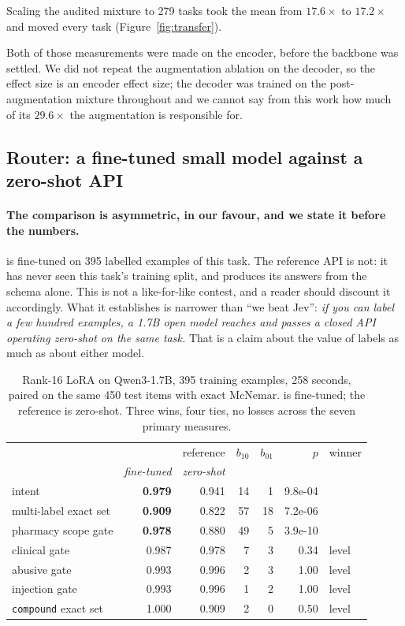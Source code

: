 Scaling the audited mixture to 279 tasks took the mean from $17.6\times$
to $17.2\times$ and moved every task (Figure~\ref{fig:transfer}).

Both of those measurements were made on the encoder, before the backbone
was settled. We did not repeat the augmentation ablation on the decoder,
so the effect size is an encoder effect size; the decoder was trained on
the post-augmentation mixture throughout and we cannot say from this work
how much of its $29.6\times$ the augmentation is responsible for.

\subsection{Router: a fine-tuned small model against a zero-shot API}
\label{sec:res-router}

\paragraph{The comparison is asymmetric, in our favour, and we state it
before the numbers.} \openjev{} is fine-tuned on 395 labelled examples of
this task. The reference API is not: it has never seen this task's
training split, and produces its answers from the schema alone. This is
not a like-for-like contest, and a reader should discount it accordingly.
What it establishes is narrower than ``we beat Jev'': \emph{if you can
label a few hundred examples, a 1.7B open model reaches and passes a
closed API operating zero-shot on the same task.} That is a claim about
the value of labels as much as about either model.

\begin{table}[t]
\centering
\begin{tabular}{lrrrrrl}
\toprule
 & \openjev{} & reference & $b_{10}$ & $b_{01}$ & $p$ & winner \\
 & \emph{fine-tuned} & \emph{zero-shot} & & & & \\
\midrule
intent                        & \textbf{0.979} & 0.941 & 14 &  1 & 9.8e-04 & \openjev{} \\
multi-label exact set         & \textbf{0.909} & 0.822 & 57 & 18 & 7.2e-06 & \openjev{} \\
pharmacy scope gate           & \textbf{0.978} & 0.880 & 49 &  5 & 3.9e-10 & \openjev{} \\
clinical gate                 & 0.987 & 0.978 &  7 &  3 & 0.34 & level \\
abusive gate                  & 0.993 & 0.996 &  2 &  3 & 1.00 & level \\
injection gate                & 0.993 & 0.996 &  1 &  2 & 1.00 & level \\
\texttt{compound} exact set   & 1.000 & 0.909 &  2 &  0 & 0.50 & level \\
\bottomrule
\end{tabular}
\caption{Rank-16 LoRA on Qwen3-1.7B, 395 training examples, 258 seconds,
paired on the same 450 test items with exact McNemar. \openjev{} is
fine-tuned; the reference is zero-shot. Three wins, four ties, no losses
across the seven primary measures.}
\label{tab:router}
\end{table}

